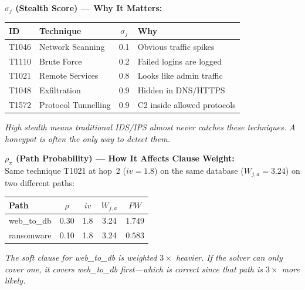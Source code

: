 \documentclass[journal]{IEEEtran}
\begin{document}
\begin{examplebox}
\textbf{$\sigma_j$ (Stealth Score) --- Why It Matters:}
\begin{center}
\small
\renewcommand{\arraystretch}{1.1}
\begin{tabular}{@{}llcl@{}}
\toprule
\textbf{ID} & \textbf{Technique} & $\sigma_j$ & \textbf{Why} \\
\midrule
T1046 & Network Scanning    & 0.1 & Obvious traffic spikes \\
T1110 & Brute Force         & 0.2 & Failed logins are logged \\
T1021 & Remote Services     & 0.8 & Looks like admin traffic \\
T1048 & Exfiltration        & 0.9 & Hidden in DNS/HTTPS \\
T1572 & Protocol Tunnelling & 0.9 & C2 inside allowed protocols \\
\bottomrule
\end{tabular}
\end{center}
\textit{High stealth means traditional IDS/IPS almost never
catches these techniques.
A honeypot is often the \emph{only} way to detect them.}
\end{examplebox}

\begin{examplebox}
\textbf{$\rho_\pi$ (Path Probability) ---
How It Affects Clause Weight:}\\[3pt]
Same technique T1021 at hop~2 ($iv=1.8$) on the same
database ($W_{j,a}=3.24$) on two different paths:
\begin{center}
\small
\renewcommand{\arraystretch}{1.1}
\begin{tabular}{@{}lcccc@{}}
\toprule
\textbf{Path} & $\rho$ & $iv$ & $W_{j,a}$ & $PW$ \\
\midrule
web\_to\_db & 0.30 & 1.8 & 3.24 & $\mathbf{1.749}$ \\
ransomware  & 0.10 & 1.8 & 3.24 & $\mathbf{0.583}$ \\
\bottomrule
\end{tabular}
\end{center}
\textit{The soft clause for web\_to\_db is weighted
$3\times$ heavier.
If the solver can only cover one, it covers web\_to\_db
first---which is correct since that path is $3\times$
more likely.}
\end{examplebox}
\end{document}
